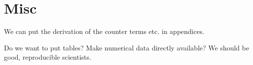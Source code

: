 \section{Misc}

We can put the derivation of the counter terms etc. in appendices.

Do we want to put tables?  Make numerical data directly available?  We should be good, reproducible scientists.







